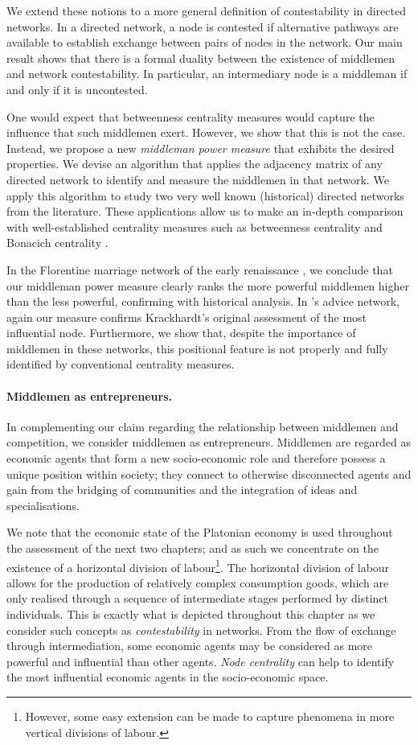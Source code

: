 We extend these notions to a more general definition of contestability in directed networks. In a directed network, a node is contested if alternative pathways are available to establish exchange between pairs of nodes in the network. Our main result shows that there is a formal duality between the existence of middlemen and network contestability. In particular, an intermediary node is a middleman if and only if it is uncontested.

One would expect that betweenness centrality measures would capture the influence that such middlemen exert. However, we show that this is not the case. Instead, we propose a new \emph{middleman power measure} that exhibits the desired properties. We devise an algorithm that applies the adjacency matrix of any directed network to identify and measure the middlemen in that network. We apply this algorithm to study two very well known (historical) directed networks from the literature. These applications allow us to make an in-depth comparison with well-established centrality measures such as betweenness centrality and Bonacich centrality \citep{Bonacich1987}.

In the Florentine marriage network of the early renaissance \citep{Padgett1993,Padgett1994}, we conclude that our middleman power measure clearly ranks the more powerful middlemen higher than the less powerful, confirming with historical analysis. In \citet{Krackhardt1987}'s advice network, again our measure confirms Krackhardt's original assessment of the most influential node. Furthermore, we show that, despite the importance of middlemen in these networks, this positional feature is not properly and fully identified by conventional centrality measures.

\paragraph{Middlemen as entrepreneurs.}

In complementing our claim regarding the relationship between middlemen and competition, we consider middlemen as entrepreneurs. Middlemen are regarded as economic agents that form a new socio-economic role and therefore possess a unique position within society; they connect to otherwise disconnected agents and gain from the bridging of communities and the integration of ideas and specialisations.

We note that the economic state of the Platonian economy is used throughout the assessment of the next two chapters; and as such we concentrate on the existence of a horizontal division of labour\footnote{However, some easy extension can be made to capture phenomena in more vertical divisions of labour.}. The horizontal division of labour allows for the production of relatively complex consumption goods, which are only realised through a sequence of intermediate stages performed by distinct individuals. This is exactly what is depicted throughout this chapter as we consider such concepts as \emph{contestability} in networks. From the flow of exchange through intermediation, some economic agents may be considered as more powerful and influential than other agents. \emph{Node centrality} can help to identify the most influential economic agents in the socio-economic space.


